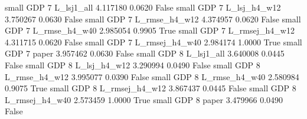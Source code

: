      small      GDP                 7     L_lsj1_all   4.117180      0.0620   False
     small      GDP                 7   L_lsj_h4_w12   3.750267      0.0630   False
     small      GDP                 7  L_rmse_h4_w12   4.374957      0.0620   False
     small      GDP                 7  L_rmse_h4_w40   2.985054      0.9905    True
     small      GDP                 7 L_rmsej_h4_w12   4.311715      0.0620   False
     small      GDP                 7 L_rmsej_h4_w40   2.984174      1.0000    True
     small      GDP                 7          paper   3.957462      0.0630   False
     small      GDP                 8     L_lsj1_all   3.640008      0.0445   False
     small      GDP                 8   L_lsj_h4_w12   3.290994      0.0490   False
     small      GDP                 8  L_rmse_h4_w12   3.995077      0.0390   False
     small      GDP                 8  L_rmse_h4_w40   2.580984      0.9075    True
     small      GDP                 8 L_rmsej_h4_w12   3.867437      0.0445   False
     small      GDP                 8 L_rmsej_h4_w40   2.573459      1.0000    True
     small      GDP                 8          paper   3.479966      0.0490   False